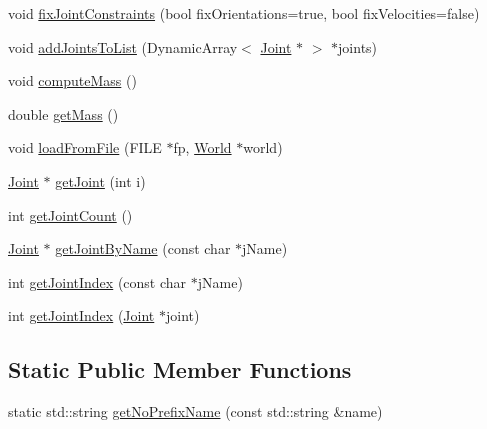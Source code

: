 \begin{DoxyCompactItemize}
\item 
void \hyperlink{classCartWheel_1_1Physics_1_1ArticulatedFigure_aba291c1bb8d97e47f7cd3d5ebd36dc10}{fixJointConstraints} (bool fixOrientations=true, bool fixVelocities=false)
\item 
void \hyperlink{classCartWheel_1_1Physics_1_1ArticulatedFigure_a5225dc621ca1da0efcf4488e68296cb8}{addJointsToList} (DynamicArray$<$ \hyperlink{classCartWheel_1_1Physics_1_1Joint}{Joint} $\ast$ $>$ $\ast$joints)
\item 
void \hyperlink{classCartWheel_1_1Physics_1_1ArticulatedFigure_a6a60bc90cdc670b6d8f6dca4dfd801af}{computeMass} ()
\item 
double \hyperlink{classCartWheel_1_1Physics_1_1ArticulatedFigure_a50d82cbfe82ff6d72a0154f629390570}{getMass} ()
\item 
void \hyperlink{classCartWheel_1_1Physics_1_1ArticulatedFigure_a8363fbd6e6894c3bbbbf05e68a6f9c30}{loadFromFile} (FILE $\ast$fp, \hyperlink{classCartWheel_1_1Physics_1_1World}{World} $\ast$world)
\item 
\hyperlink{classCartWheel_1_1Physics_1_1Joint}{Joint} $\ast$ \hyperlink{classCartWheel_1_1Physics_1_1ArticulatedFigure_a246d04e0805756140b239decf974cb6a}{getJoint} (int i)
\item 
int \hyperlink{classCartWheel_1_1Physics_1_1ArticulatedFigure_a8e459d7799f5db763db1f28b6d0b8747}{getJointCount} ()
\item 
\hyperlink{classCartWheel_1_1Physics_1_1Joint}{Joint} $\ast$ \hyperlink{classCartWheel_1_1Physics_1_1ArticulatedFigure_acea82656e252a6fd1368eae140f123f3}{getJointByName} (const char $\ast$jName)
\item 
int \hyperlink{classCartWheel_1_1Physics_1_1ArticulatedFigure_a4096aa039849960ae74a0ff601947950}{getJointIndex} (const char $\ast$jName)
\item 
int \hyperlink{classCartWheel_1_1Physics_1_1ArticulatedFigure_afb1246e7a496fa524ed2132b7fc8ccb0}{getJointIndex} (\hyperlink{classCartWheel_1_1Physics_1_1Joint}{Joint} $\ast$joint)
\end{DoxyCompactItemize}
\subsection*{Static Public Member Functions}
\begin{DoxyCompactItemize}
\item 
static std::string \hyperlink{classCartWheel_1_1Physics_1_1ArticulatedFigure_a7ea2a7587961f136ba0151dc029bd606}{getNoPrefixName} (const std::string \&name)
\end{DoxyCompactItemize}
